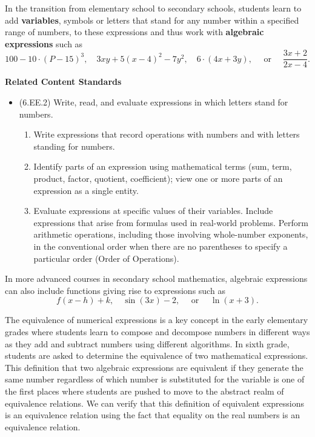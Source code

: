 \documentclass[
]{book}
\providecommand{\tightlist}{%
  \setlength{\itemsep}{0pt}\setlength{\parskip}{0pt}}
\newenvironment{standards}{}{}
\theoremstyle{definition}
\theoremstyle{definition}
\theoremstyle{definition}
\theoremstyle{definition}
\theoremstyle{remark}
\begin{document}
In the transition from elementary school to secondary schools, students learn to add \textbf{variables}, symbols or letters that stand for any number within a specified range of numbers, to these expressions and thus work with \textbf{algebraic expressions} such as
\[100-10\cdot (P-15)^3,  \quad 3xy + 5(x-4)^2-7y^2, \quad 6\cdot (4x+3y), \quad \mbox{ or }\quad  \frac{3x+2}{2x-4}.\]

\begin{standards}

\begin{center}
\textbf{Related Content Standards}

\end{center}

\begin{itemize}
\item
  (6.EE.2) Write, read, and evaluate expressions in which letters stand for numbers.

  \begin{enumerate}
  \def\labelenumi{\alph{enumi}.}
  \tightlist
  \item
    Write expressions that record operations with numbers and with letters standing for numbers.
  \item
    Identify parts of an expression using mathematical terms (sum, term, product, factor, quotient, coefficient); view one or more parts of an expression as a single entity.
  \item
    Evaluate expressions at specific values of their variables. Include expressions that arise from formulas used in real-world problems. Perform arithmetic operations, including those involving whole-number exponents, in the conventional order when there are no parentheses to specify a particular order (Order of Operations).
  \end{enumerate}
\end{itemize}

\end{standards}

In more advanced courses in secondary school mathematics, algebraic expressions can also include functions giving rise to expressions such as
\[f(x-h)+k, \quad \sin(3x)-2, \quad \mbox{ or } \quad  \ln(x+3).\]

The equivalence of numerical expressions is a key concept in the early elementary grades where students learn to compose and decompose numbers in different ways as they add and subtract numbers using different algorithms. In sixth grade, students are asked to determine the equivalence of two mathematical expressions. This definition that two algebraic expressions are equivalent if they generate the same number regardless of which number is substituted for the variable is one of the first places where students are pushed to move to the abstract realm of equivalence relations. We can verify that this definition of equivalent expressions is an equivalence relation using the fact that equality on the real numbers is an equivalence relation.
\end{document}
